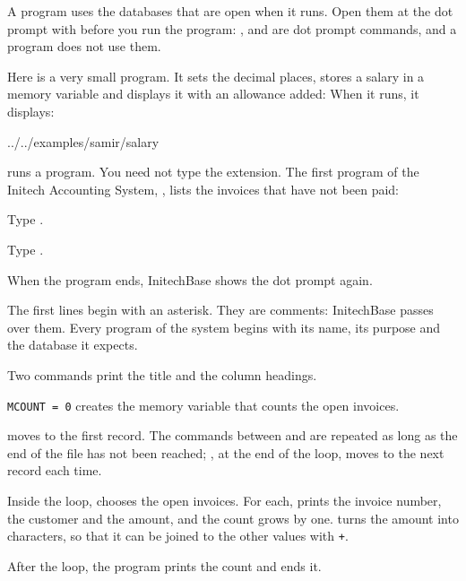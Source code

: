A program uses the databases that are open when it runs.  Open them at the dot
prompt with  before you run the program: ,  and
 are dot prompt commands, and a program does not use them.

Here is a very small program.  It sets the decimal places, stores a salary in
a memory variable and displays it with an allowance added:
When it runs, it displays:
\begin{Transcript}{../../examples/samir/salary}
\end{Transcript}

 runs a program.  You need not type the extension.  The first program of
the Initech Accounting System, , lists the invoices that have
not been paid:
\begin{Steps}[resume]
\item Type .
\item Type .
\end{Steps}
When the program ends, InitechBase shows the dot prompt again.

The first lines begin with an asterisk.  They are comments:
InitechBase passes over them.  Every program of the system begins with its
name, its purpose and the database it expects.

Two  commands print the title and the column
headings.

\texttt{MCOUNT = 0} creates the memory variable that counts
the open invoices.

 moves to the first record.  The commands
between  and  are repeated as long as the end of the
file has not been reached; , at the end of the loop, moves to the
next record each time.

Inside the loop,  chooses the open
invoices.  For each,  prints the invoice number, the customer and the
amount, and the count grows by one.   turns the amount into
characters, so that it can be joined to the other values with \texttt{+}.

After the loop, the program prints the count and
 ends it.

